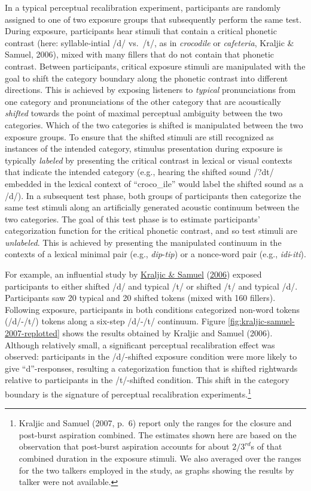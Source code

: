 \documentclass[
  11pt,
  english,
  man,floatsintext]{apa6}
\begin{document}
In a typical perceptual recalibration experiment, participants are randomly assigned to one of two exposure groups that subsequently perform the same test. During exposure, participants hear stimuli that contain a critical phonetic contrast (here: syllable-intial /d/ vs.~/t/, as in \emph{croco\emph{d}ile} or \emph{cafe\emph{t}eria}, Kraljic \& Samuel, 2006), mixed with many fillers that do not contain that phonetic contrast. Between participants, critical exposure stimuli are manipulated with the goal to shift the category boundary along the phonetic contrast into different directions. This is achieved by exposing listeners to \emph{typical} pronunciations from one category and pronunciations of the other category that are acoustically \emph{shifted} towards the point of maximal perceptual ambiguity between the two categories. Which of the two categories is shifted is manipulated between the two exposure groups. To ensure that the shifted stimuli are still recognized as instances of the intended category, stimulus presentation during exposure is typically \emph{labeled} by presenting the critical contrast in lexical or visual contexts that indicate the intended category (e.g., hearing the shifted sound /?dt/ embedded in the lexical context of ``croco\_ile'' would label the shifted sound as a /d/). In a subsequent test phase, both groups of participants then categorize the same test stimuli along an artificially generated acoustic continuum between the two categories. The goal of this test phase is to estimate participants' categorization function for the critical phonetic contrast, and so test stimuli are \emph{unlabeled}. This is achieved by presenting the manipulated continuum in the contexts of a lexical minimal pair (e.g., \emph{dip}-\emph{tip}) or a nonce-word pair (e.g., \emph{idi}-\emph{iti}).

For example, an influential study by \protect\hyperlink{ref-kraljic-samuel2006}{Kraljic \& Samuel} (\protect\hyperlink{ref-kraljic-samuel2006}{2006}) exposed participants to either shifted /d/ and typical /t/ or shifted /t/ and typical /d/. Participants saw 20 typical and 20 shifted tokens (mixed with 160 fillers). Following exposure, participants in both conditions categorized non-word tokens (/d/-/t/) tokens along a six-step /d/-/t/ continuum. Figure \ref{fig:kraljic-samuel-2007-replotted} shows the results obtained by Kraljic and Samuel (2006). Although relatively small, a significant perceptual recalibration effect was observed: participants in the /d/-shifted exposure condition were more likely to give ``d''-responses, resulting a categorization function that is shifted rightwards relative to participants in the /t/-shifted condition. This shift in the category boundary is the signature of perceptual recalibration experiments.\footnote{Kraljic and Samuel (2007, p.~6) report only the ranges for the closure and post-burst aspiration combined. The estimates shown here are based on the observation that post-burst aspiration accounts for about \(2/3^{rd}\)s of that combined duration in the exposure stimuli. We also averaged over the ranges for the two talkers employed in the study, as graphs showing the results by talker were not available.}
\end{document}
